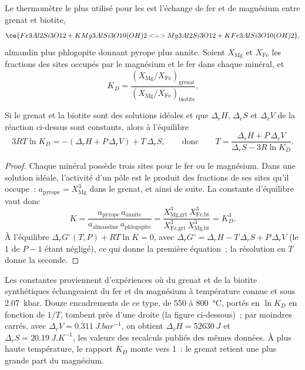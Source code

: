 Le thermomètre le plus utilisé pour les  est l'échange de fer et de magnésium
entre grenat et biotite,
\[
\ce{Fe3Al2Si3O12 + KMg3AlSi3O10(OH)2 <=> Mg3Al2Si3O12 + KFe3AlSi3O10(OH)2},
\]
almandin plus phlogopite donnant pyrope plus annite. Soient $X_{\text{Mg}}$ et $X_{\text{Fe}}$
les fractions des sites occupés par le magnésium et le fer dans chaque minéral, et
\[
K_D = \frac{(X_{\text{Mg}}/X_{\text{Fe}})_{\text{grenat}}}{(X_{\text{Mg}}/X_{\text{Fe}})_{\text{biotite}}}.
\]

\begin{proposition}\label{prop:b2:pt-paths:exchange}
Si le grenat et la biotite sont des solutions idéales et que $\Delta_r H$, $\Delta_r S$ et $\Delta_r V$ de
la réaction ci-dessus sont constants, alors à l'équilibre
\[
3RT\ln K_D = -(\Delta_r H + P\,\Delta_r V) + T\,\Delta_r S,
\qquad\text{donc}\qquad
T = \frac{\Delta_r H + P\,\Delta_r V}{\Delta_r S - 3R\ln K_D}.
\]
\end{proposition}

\begin{proof}
Chaque minéral possède trois sites pour le fer ou le magnésium. Dans une solution idéale, l'activité
d'un pôle est le produit des fractions de ses sites qu'il occupe~: $a_{\text{pyrope}} =
X_{\text{Mg}}^3$ dans le grenat, et ainsi de suite. La constante d'équilibre vaut donc
\[
K = \frac{a_{\text{pyrope}}\,a_{\text{annite}}}{a_{\text{almandine}}\,a_{\text{phlogopite}}}
= \frac{X_{\text{Mg,grt}}^3\,X_{\text{Fe,bt}}^3}{X_{\text{Fe,grt}}^3\,X_{\text{Mg,bt}}^3} = K_D^3 .
\]
À l'équilibre $\Delta_r G^\circ(T, P) + RT\ln K = 0$, avec $\Delta_r G^\circ = \Delta_r H -
T\,\Delta_r S + P\,\Delta_r V$ (le 1 de $P - 1$ étant négligé), ce qui donne la première équation~;
la résolution en $T$ donne la seconde.
\end{proof}

Les constantes proviennent d'expériences où du grenat et de la biotite synthétiques échangeaient du fer
et du magnésium à température connue et sous \qty{2.07}{kbar}. Douze encadrements de ce type, de 550 à
\qty{800}{\celsius}, portés en $\ln K_D$ en fonction de $1/T$, tombent près d'une droite (la figure
ci-dessous)~; par moindres carrés, avec $\Delta_r V = \qty{0.311}{J.bar^{-1}}$, on obtient
$\Delta_r H = \qty{52630}{J}$ et $\Delta_r S = \qty{20.19}{J.K^{-1}}$, les valeurs des
recalculs publiés des mêmes données. À plus haute température, le rapport $K_D$ monte
vers 1~: le grenat retient une plus grande part du magnésium.

